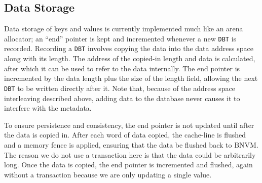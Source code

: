 \subsection{Data Storage}
\label{sec:ds}

Data storage of keys and values is currently implemented much like an arena
allocator; an ``end'' pointer is kept and incremented whenever a new \texttt{DBT} is
recorded. Recording a \texttt{DBT} involves copying the data into the data
address space along with its length. The address of the copied-in length and
data is calculated, after which it can be used to refer to the data internally.
The end pointer is incremented by the data length plus the size of the length
field, allowing the next \texttt{DBT} to be written directly after it. Note
that, because of the address space interleaving described above, adding data to
the database never causes it to interfere with the metadata.

To ensure persistence and consistency, the end pointer is not updated until
after the data is copied in. After each word of data copied, the cache-line
is flushed and a memory fence is applied, ensuring that the data be flushed back
to BNVM.
The reason we do not use a transaction here is that the
data could be arbitrarily long. Once the data is copied, the end pointer is
incremented and flushed, again without a transaction because we are
only updating a single value.




